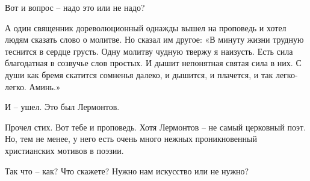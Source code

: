 Вот и вопрос – надо это или не надо? 

А один священник дореволюционный однажды вышел на проповедь и хотел людям
сказать слово о молитве. Но сказал им другое: «В минуту жизни трудную теснится
в сердце грусть. Одну молитву чудную твержу я наизусть. Есть сила благодатная в
созвучье слов простых. И дышит непонятная святая сила в них. С души как бремя
скатится сомненья далеко, и дышится, и плачется, и так легко-легко. Аминь.» 

И – ушел. Это был Лермонтов. 

Прочел стих. Вот тебе и проповедь. Хотя Лермонтов – не самый церковный поэт.
Но, тем не менее, у него есть очень много нежных проникновенный христианских
мотивов в поэзии. 

Так что – как? Что скажете? Нужно нам искусство или не нужно? 

